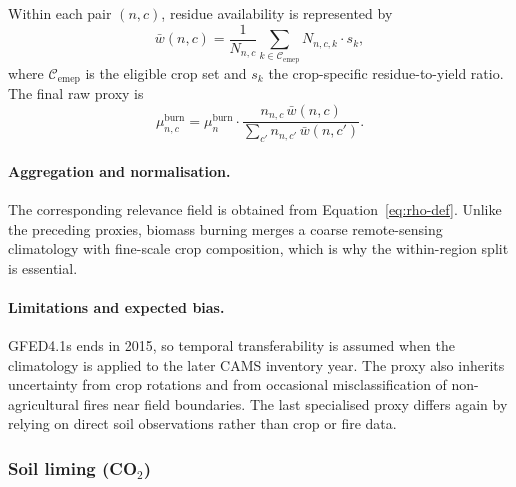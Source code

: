 Within each pair $(n,c)$, residue availability is represented by
\begin{equation}
  \bar{w}(n,c) =
  \frac{1}{N_{n,c}}
  \sum_{k \in \mathcal{C}_{\mathrm{emep}}} N_{n,c,k} \cdot s_k,
  \label{eq:lucas-weight}
\end{equation}
where $\mathcal{C}_{\mathrm{emep}}$ is the eligible crop set and $s_k$
the crop-specific residue-to-yield ratio. The final raw proxy is
\begin{equation}
  \mu_{n,c}^{\mathrm{burn}} =
  \mu_n^{\mathrm{burn}} \cdot
  \frac{n_{n,c}\,\bar{w}(n,c)}
       {\displaystyle\sum_{c'} n_{n,c'}\,\bar{w}(n,c')}.
  \label{eq:clc-split}
\end{equation}

\paragraph{Aggregation and normalisation.}
The corresponding relevance field is obtained from
Equation~\ref{eq:rho-def}. Unlike the preceding proxies, biomass
burning merges a coarse remote-sensing climatology with fine-scale crop
composition, which is why the within-region split is essential.

\paragraph{Limitations and expected bias.}
GFED4.1s ends in 2015, so temporal transferability is assumed when the
climatology is applied to the later CAMS inventory year. The proxy also
inherits uncertainty from crop rotations and from occasional
misclassification of non-agricultural fires near field boundaries. The
last specialised proxy differs again by relying on direct soil
observations rather than crop or fire data.

\subsubsection{Soil liming (CO$_2$)}
\label{sec:proxy-liming}

